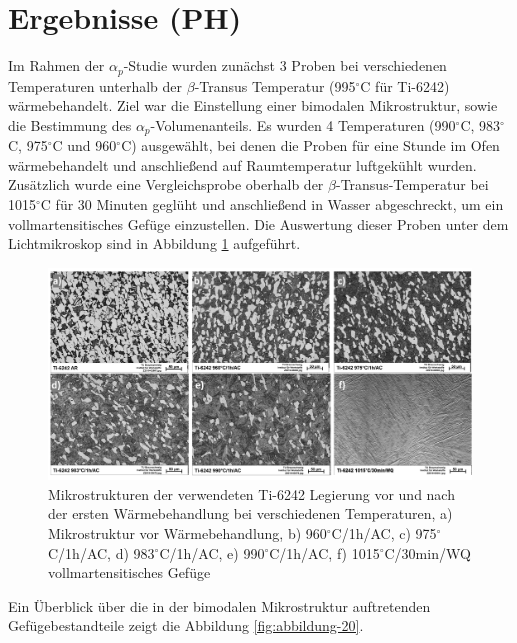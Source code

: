 \section{Ergebnisse (PH)}

Im Rahmen der $\alpha_p$-Studie wurden zunächst 3 Proben bei verschiedenen Temperaturen unterhalb der $\beta$-Transus Temperatur (995$^\circ$C für Ti-6242) wärmebehandelt. Ziel war die Einstellung einer bimodalen Mikrostruktur, sowie die Bestimmung des $\alpha_p$-Volumenanteils. Es wurden 4 Temperaturen (990$^\circ$C, 983$^\circ$C, 975$^\circ$C und 960$^\circ$C) ausgewählt, bei denen die Proben für eine Stunde im Ofen wärmebehandelt und anschließend auf Raumtemperatur luftgekühlt wurden. Zusätzlich wurde eine Vergleichsprobe oberhalb der $\beta$-Transus-Temperatur bei 1015$^\circ$C für 30 Minuten geglüht und anschließend in Wasser abgeschreckt, um ein vollmartensitisches Gefüge einzustellen. Die Auswertung dieser Proben unter dem Lichtmikroskop sind in Abbildung \ref{fig:abbildung-8} aufgeführt. 

\begin{figure}[h]
	\centering
	\includegraphics[width=1.0\linewidth]{./Bilder/Abbildung 8}
	\caption[Abbildung 8]{Mikrostrukturen der verwendeten Ti-6242 Legierung vor und nach der ersten Wärmebehandlung bei verschiedenen Temperaturen, a) Mikrostruktur vor Wärmebehandlung, b) 960$^\circ$C/1h/AC, c) 975$^\circ$C/1h/AC, d) 983$^\circ$C/1h/AC, e) 990$^\circ$C/1h/AC, f) 1015$^\circ$C/30min/WQ vollmartensitisches Gefüge}
	\label{fig:abbildung-8}
\end{figure}

Ein Überblick über die in der bimodalen Mikrostruktur auftretenden Gefügebestandteile zeigt die Abbildung \ref{fig:abbildung-20}.

